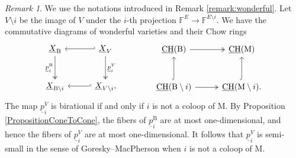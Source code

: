 \documentclass[11pt,reqno]{amsart}
\theoremstyle{definition}
\theoremstyle{remark}
\newtheorem{remark}[theorem]{Remark}
\renewcommand{\(}{\left(}
\renewcommand{\)}{\right)}
\newcommand{\<}{\left<}
\renewcommand{\>}{\right>}
\newcommand{\CH}{\operatorname{CH}}
\begin{document}
\begin{remark}
We use the notations introduced in Remark \ref{remark:wonderful}.
Let $V \setminus i$ be the image of $V$ under the $i$-th projection
$\mathbb{F}^E \to \mathbb{F}^{E \setminus i}$.
We have the commutative diagrams of wonderful varieties and their Chow rings
\[
\begin{tikzcd}[column sep=10mm, row sep=10mm]
\underline{X}_\mathrm{B}  \arrow[d, two heads, "\underline{p}_i^\mathrm{B}"'] & \underline{X}_V \arrow[d, two heads, "\underline{p}_i^V"]  \arrow[l, hook']\\
\underline{X}_{\mathrm{B} \setminus i} & \underline{X}_{V \setminus i}, \arrow[l, hook']
\end{tikzcd}
\qquad  \qquad
\begin{tikzcd}[column sep=10mm, row sep=10mm]
\underline{\CH}(\mathrm{B}) \arrow[r, two heads]& \underline{\CH}(\mathrm{M})  \\
\underline{\CH}({\mathrm{B} \setminus i}) \arrow[u, hook]\arrow[r, two heads]& \underline{\CH}(\mathrm{M} \setminus i). \arrow[u, hook]
\end{tikzcd}
\]
The map  $\underline{p}_i^V$ is birational if and only if $i$ is not a coloop of $\mathrm{M}$.
By Proposition \ref{PropositionConeToCone}, the fibers of $\underline{p}_i^\mathrm{B}$ are at most one-dimensional,
and hence the fibers of $\underline{p}_i^V$ are at most one-dimensional.
It follows that  $\underline{p}_i^V$ is semi-small in the sense of Goresky--MacPherson when $i$ is not a coloop of $\mathrm{M}$.



\end{remark}
\end{document}
